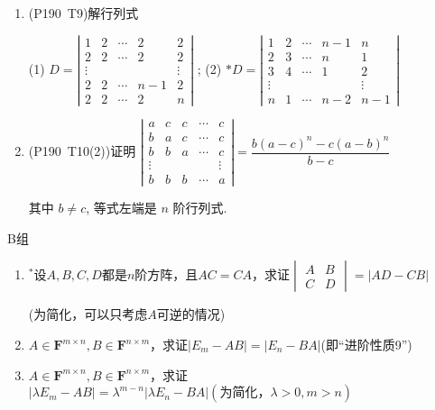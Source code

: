 \begin{enumerate}
    \item (P190\ T9)解行列式
    
    (1) $D=\left|\begin{array}{ccccc}
    1 & 2 & \cdots & 2 & 2 \\
    2 & 2 & \cdots & 2 & 2 \\
    \vdots & & & & \vdots \\
    2 & 2 & \cdots & n-1 & 2 \\
    2 & 2 & \cdots & 2 & n\end{array}\right|$ ;
    (2) $*D=\left|\begin{array}{ccccc}
    1 & 2 & \cdots & n-1 & n \\
    2 & 3 & \cdots & n & 1 \\
    3 & 4 & \cdots & 1 & 2 \\
    \vdots & & & & \vdots \\
    n & 1 & \cdots & n-2 & n-1
    \end{array}\right|$
    
    \item (P190\ T10(2))证明
    $\left|\begin{array}{ccccc}
    a & c & c & \cdots & c \\
    b & a & c & \cdots & c \\
    b & b & a & \cdots & c \\
    \vdots & & & & \vdots \\
    b & b & b & \cdots & a
    \end{array}\right|=\dfrac{b(a-c)^{n}-c(a-b)^{n}}{b-c}$
    
    其中 $b \neq c$, 等式左端是 $n$ 阶行列式.
\end{enumerate}
\centerline{\heiti B组}
\begin{enumerate}
    \item $^*$设$A,B,C,D$都是$n$阶方阵，且$AC=CA$，求证$\begin{vmatrix}
    A&B\\
    C&D
    \end{vmatrix}=|AD-CB|$
    
    (为简化，可以只考虑$A$可逆的情况)
    
    \item $A\in \mathbf{F}^{m\times n}, B\in \mathbf{F}^{n\times m}$，求证$|E_m-AB|=|E_n-BA|$(即“进阶性质9”)
    
    \item $A\in \mathbf{F}^{m\times n}, B\in \mathbf{F}^{n\times m}$，求证$|\lambda E_m-AB|=\lambda^{m-n}|\lambda E_n-BA|(\text{为简化，}\lambda>0, m>n)$
\end{enumerate}
